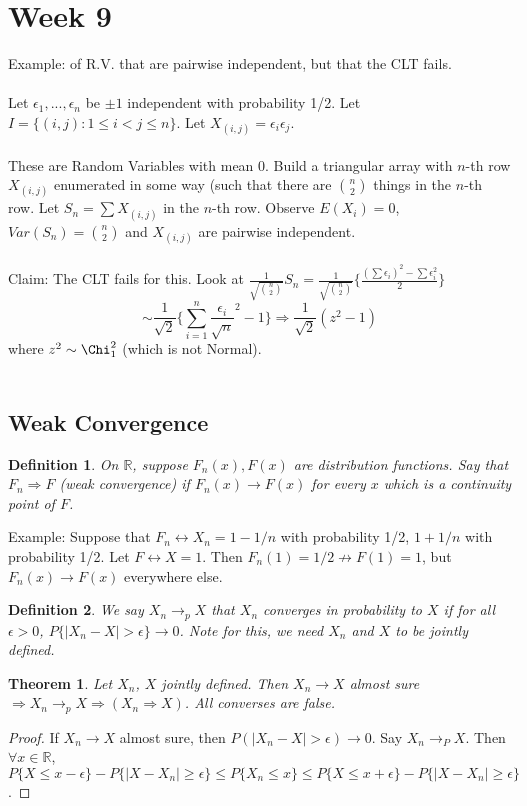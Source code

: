 \documentclass[12pt]{article}
\newtheorem{theorem}{Theorem}
\newtheorem{defn}{Definition}
\begin{document}
\section{Week 9}
Example: of R.V. that are pairwise independent, but that the CLT fails.
\\ \\
Let $\epsilon_1, ..., \epsilon_n$ be $\pm 1$ independent with probability 1/2.  Let $I = \{ (i, j) : 1 \le i < j \le n \}$.  Let $X_{(i, j)} = \epsilon_i \epsilon_j$.
\\ \\
These are Random Variables with mean 0.  Build a triangular array with $n$-th row $X_{(i, j)}$ enumerated in some way (such that there are ${n \choose 2}$ things in the $n$-th row.  Let $S_n = \sum X_{(i, j)}$ in the $n$-th row.  Observe $E(X_i) = 0$, $Var(S_n) = {n \choose 2}$ and $X_{(i, j)}$ are pairwise independent.
\\ \\
Claim: The CLT fails for this.  Look at $\frac{1}{\sqrt{{n \choose 2}}} S_n = \frac{1}{\sqrt{{n \choose 2}}} \{ \frac{ (\sum \epsilon_i)^2 - \sum \epsilon_i^2 }{2} \}$
$$\sim \frac{1}{\sqrt{2}} \{ \sum_{i=1}^n \frac{\epsilon_i}{\sqrt{n}}^2 - 1 \} \Rightarrow \frac{1}{\sqrt{2}} (z^2 - 1)$$
where $z^2 \sim \Chi_1^2$ (which is not Normal).
\\ \\
\subsection{Weak Convergence}
\begin{defn}
On $\mathbb{R}$, suppose $F_n(x), F(x)$ are distribution functions.  Say that $F_n \Rightarrow F$ (weak convergence) if $F_n(x) \to F(x)$ for every $x$ which is a continuity point of $F$.
\end{defn}

Example: Suppose that $F_n \leftrightarrow X_n = 1 - 1/n$ with probability 1/2, $1 + 1/n$ with probability 1/2.  Let $F \leftrightarrow X = 1$.  Then $F_n(1) = 1/2 \not\to F(1) = 1$, but $F_n(x) \to F(x)$ everywhere else.

\begin{defn}
We say $X_n \to_p X$ that $X_n$ converges in probability to $X$ if for all $\epsilon > 0$, $P \{ | X_n - X | > \epsilon \} \to 0$.  Note for this, we need $X_n$ and $X$ to be jointly defined.
\end{defn}

\begin{theorem}
Let $X_n$, $X$ jointly defined.  Then $X_n \to X$ almost sure $\Rightarrow X_n \to_p X \Rightarrow (X_n \Rightarrow X)$.  All converses are false.
\end{theorem}
\begin{proof}
If $X_n \to X$ almost sure, then $P(|X_n - X| > \epsilon) \to 0$.  Say $X_n \to_P X$.  Then $\forall x \in \mathbb{R}$, $P \{ X \le x - \epsilon \} - P \{ |X - X_n| \ge \epsilon \} \le P \{X_n \le x \} \le P \{X \le x + \epsilon \} - P \{ |X - X_n | \ge \epsilon \}$.
\end{proof}
\end{document}

